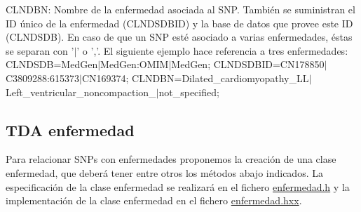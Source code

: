 \begin{DoxyItemize}
\begin{DoxyItemize}
\item C\-L\-N\-D\-B\-N\-: Nombre de la enfermedad asociada al S\-N\-P. También se suministran el I\-D único de la enfermedad (C\-L\-N\-D\-S\-D\-B\-I\-D) y la base de datos que provee este I\-D (C\-L\-N\-D\-S\-D\-B). En caso de que un S\-N\-P esté asociado a varias enfermedades, éstas se separan con '$\vert$' o ','. El siguiente ejemplo hace referencia a tres enfermedades\-: C\-L\-N\-D\-S\-D\-B=Med\-Gen$\vert$\-Med\-Gen\-:O\-M\-I\-M$\vert$\-Med\-Gen; C\-L\-N\-D\-S\-D\-B\-I\-D=C\-N178850$\vert$\-C3809288\-:615373$\vert$\-C\-N169374; C\-L\-N\-D\-B\-N=Dilated\-\_\-cardiomyopathy\-\_\-L\-L$\vert$\-Left\-\_\-ventricular\-\_\-noncompaction\-\_$\vert$not\-\_\-specified;
\end{DoxyItemize}\end{DoxyItemize}
\hypertarget{index_enfermedad}{}\subsection{T\-D\-A enfermedad}\label{index_enfermedad}
Para relacionar S\-N\-Ps con enfermedades proponemos la creación de una clase enfermedad, que deberá tener entre otros los métodos abajo indicados. La especificación de la clase enfermedad se realizará en el fichero \hyperlink{enfermedad_8h}{enfermedad.\-h} y la implementación de la clase enfermedad en el fichero \hyperlink{enfermedad_8hxx}{enfermedad.\-hxx}.


